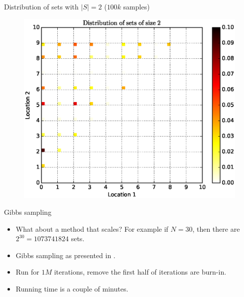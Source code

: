 \documentclass{beamer}
\begin{document}
\begin{frame}{Distribution of sets with $|S| = 2$ ($100k$ samples)}
  \begin{figure}
    \centering
    \includegraphics[height=0.8\textheight]{pairs_histogram_exact}
  \end{figure}
\end{frame}

\begin{frame}{Gibbs sampling}
  \begin{itemize}
    \item What about a method that scales? For example if $N = 30$, then there are $2^{30} = 1073741824$ sets.
    \item Gibbs sampling as presented in \cite{gotovos15sampling}.
    \item Run for $1M$ iterations, remove the first half of iterations are burn-in.
    \item Running time is a couple of minutes.
  \end{itemize}
\end{frame}
\end{document}

